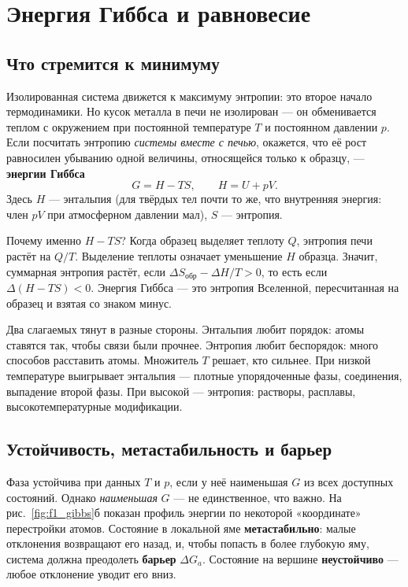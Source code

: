 \chapter{Энергия Гиббса и равновесие}

\section{Что стремится к минимуму}

Изолированная система движется к максимуму энтропии: это второе начало термодинамики. Но кусок металла в печи
не изолирован --- он обменивается теплом с окружением при постоянной температуре $T$ и постоянном давлении $p$.
Если посчитать энтропию \emph{системы вместе с печью}, окажется, что её рост равносилен убыванию одной величины,
относящейся только к образцу, --- \textbf{энергии Гиббса}
\begin{equation}
G = H - TS,\qquad H = U + pV .
\end{equation}
Здесь $H$ --- энтальпия (для твёрдых тел почти то же, что внутренняя энергия: член $pV$ при атмосферном давлении
мал), $S$ --- энтропия.

\begin{idea}
Почему именно $H - TS$? Когда образец выделяет теплоту $Q$, энтропия печи растёт на $Q/T$. Выделение теплоты
означает уменьшение $H$ образца. Значит, суммарная энтропия растёт, если $\Delta S_{\text{обр}} - \Delta H/T > 0$,
то есть если $\Delta(H - TS) < 0$. Энергия Гиббса --- это энтропия Вселенной, пересчитанная на образец и взятая
со знаком минус.
\end{idea}

Два слагаемых тянут в разные стороны. Энтальпия любит порядок: атомы ставятся так, чтобы связи были
прочнее. Энтропия любит беспорядок: много способов расставить атомы. Множитель $T$ решает, кто сильнее. При
низкой температуре выигрывает энтальпия --- плотные упорядоченные фазы, соединения, выпадение второй фазы. При
высокой --- энтропия: растворы, расплавы, высокотемпературные модификации.

\section{Устойчивость, метастабильность и барьер}

Фаза устойчива при данных $T$ и $p$, если у неё наименьшая $G$ из всех доступных состояний. Однако
\emph{наименьшая} $G$ --- не единственное, что важно. На рис.~\ref{fig:f1_gibbs}б показан профиль энергии по
некоторой «координате» перестройки атомов. Состояние в локальной яме \textbf{метастабильно}: малые отклонения
возвращают его назад, и, чтобы попасть в более глубокую яму, система должна преодолеть \textbf{барьер}
$\Delta G_a$. Состояние на вершине \textbf{неустойчиво} --- любое отклонение уводит его вниз.


